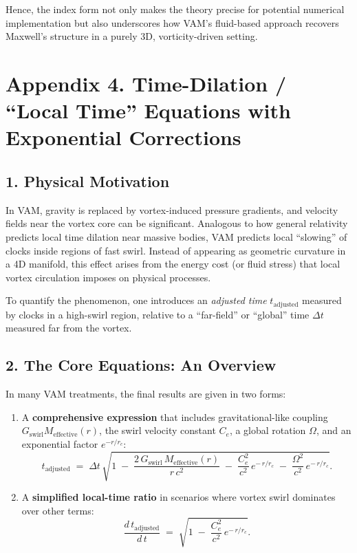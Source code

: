 \documentclass[aps,preprint,superscriptaddress]{revtex4-2}
\begin{document}
    Hence, the index form not only makes the theory precise for potential numerical implementation but also underscores how VAM’s fluid-based approach recovers Maxwell’s structure in a purely 3D, vorticity-driven setting.

    \section*{Appendix 4. Time-Dilation / “Local Time” Equations with Exponential Corrections}

    \subsection*{1. Physical Motivation}

    In VAM, gravity is replaced by vortex-induced pressure gradients, and velocity fields near the vortex core can be significant. Analogous to how general relativity predicts local time dilation near massive bodies, VAM predicts local “slowing” of clocks inside regions of fast swirl. Instead of appearing as geometric curvature in a 4D manifold, this effect arises from the energy cost (or fluid stress) that local vortex circulation imposes on physical processes.

    To quantify the phenomenon, one introduces an \textit{adjusted time} \(t_{\text{adjusted}}\) measured by clocks in a high-swirl region, relative to a “far-field” or “global” time \(\Delta t\) measured far from the vortex.

    \subsection*{2. The Core Equations: An Overview}

    In many VAM treatments, the final results are given in two forms:

    \begin{enumerate}
        \item A \textbf{comprehensive expression} that includes gravitational-like coupling \(G_{\text{swirl}} M_{\text{effective}}(r)\), the swirl velocity constant \(C_e\), a global rotation \(\Omega\), and an exponential factor \(e^{-r/r_c}\):
    \[
            t_{\text{adjusted}}
            \;=\;
            \Delta t \,\sqrt{
                1
                \;-\;
                \frac{2\,G_{\text{swirl}}\,M_{\text{effective}}(r)}{r\,c^2}
                \;-\;
                \frac{C_e^2}{c^2}\, e^{-\,r/r_c}
                \;-\;
                \frac{\Omega^2}{c^2}\, e^{-\,r/r_c}
        }.
    \]
        \item A \textbf{simplified local-time ratio} in scenarios where vortex swirl dominates over other terms:
    \[
            \frac{d\,t_{\text{adjusted}}}{d\,t}
            \;=\;
            \sqrt{
                1
                \;-\;
                \frac{C_e^2}{c^2}\, e^{-\,r/r_c}
            }.
    \]
    \end{enumerate}
\end{document}
